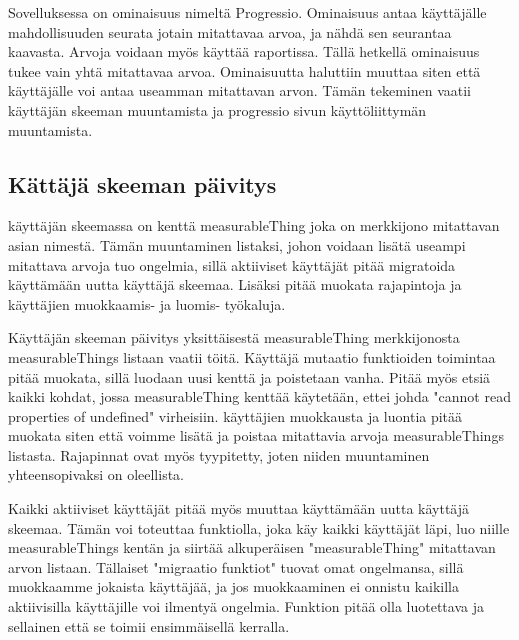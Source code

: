 



Sovelluksessa on ominaisuus nimeltä Progressio. Ominaisuus antaa käyttäjälle mahdollisuuden seurata jotain mitattavaa arvoa, ja nähdä sen seurantaa kaavasta.
Arvoja voidaan myös käyttää raportissa.
%
Tällä hetkellä ominaisuus tukee vain yhtä mitattavaa arvoa.
Ominaisuutta haluttiin muuttaa siten että käyttäjälle voi antaa useamman mitattavan arvon. 
Tämän tekeminen vaatii käyttäjän skeeman muuntamista ja progressio sivun käyttöliittymän muuntamista.
\medskip






\subsection*{Kättäjä skeeman päivitys}


käyttäjän skeemassa on kenttä measurableThing joka on merkkijono mitattavan asian nimestä.
Tämän muuntaminen listaksi, johon voidaan lisätä useampi mitattava arvoja tuo ongelmia, sillä aktiiviset käyttäjät pitää migratoida käyttämään uutta käyttäjä skeemaa. 
Lisäksi pitää muokata rajapintoja ja käyttäjien muokkaamis- ja luomis- työkaluja.
\medskip



Käyttäjän skeeman päivitys yksittäisestä measurableThing merkkijonosta measurableThings listaan vaatii töitä.
Käyttäjä mutaatio funktioiden toimintaa pitää muokata, sillä luodaan uusi kenttä ja poistetaan vanha.
Pitää myös etsiä kaikki kohdat, jossa measurableThing kenttää käytetään, ettei johda "cannot read properties of undefined"{} virheisiin.
käyttäjien muokkausta ja luontia pitää muokata siten että voimme lisätä ja poistaa mitattavia arvoja measurableThings listasta.
Rajapinnat ovat myös tyypitetty, joten niiden muuntaminen yhteensopivaksi on oleellista.
\medskip


Kaikki aktiiviset käyttäjät pitää myös muuttaa käyttämään uutta käyttäjä skeemaa.
Tämän voi toteuttaa funktiolla, joka käy kaikki käyttäjät läpi, luo niille measurableThings kentän ja siirtää alkuperäisen "measurableThing"{} mitattavan arvon listaan.
Tällaiset "migraatio funktiot"{} tuovat omat ongelmansa, sillä muokkaamme jokaista käyttäjää, ja jos muokkaaminen ei onnistu kaikilla aktiivisilla käyttäjille voi ilmentyä ongelmia.
Funktion pitää olla luotettava ja sellainen että se toimii ensimmäisellä kerralla.
\medskip




